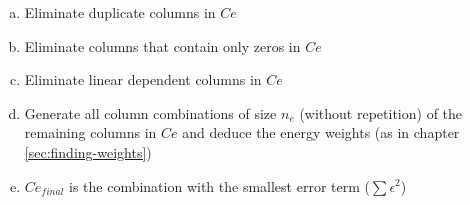 
\begin{enumerate}[(a)]

\item Eliminate duplicate columns in $Ce$

\item Eliminate columns that contain only zeros in $Ce$

\item Eliminate linear dependent columns in $Ce$

\item Generate all column combinations of size $n_e$ (without repetition) of the
remaining columns in $Ce$ and deduce the energy weights (as in chapter
\ref{sec:finding-weights})

\item $Ce_{final}$ is the combination with the smallest error term
($\sum\epsilon^2$)

\end{enumerate}

